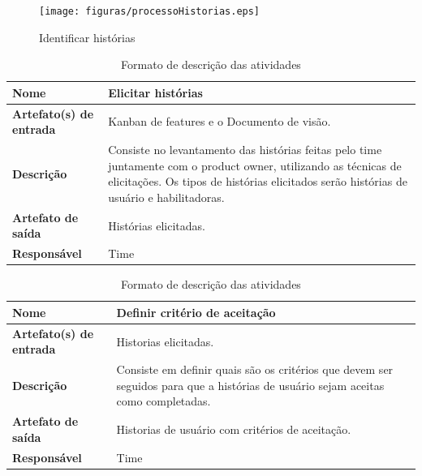 \begin{figure}[H]
    \centering
    \caption{Identificar histórias}
    \label{processoHistorias}
    \texttt{[image: figuras/processoHistorias.eps]}
\end{figure}

\begin{table}[h]
    \centering
    \label{descricaoAtividades}
    \caption{Formato de descrição das atividades}
        \begin{tabular}{|l|p{10cm}|}
        \hline
        \textbf{Nome} & Elicitar histórias \\
        \hline
        \textbf{Artefato(s) de entrada} & Kanban de features e o Documento de visão. \\
        \hline
        \textbf{Descrição} & Consiste no levantamento das histórias feitas pelo time juntamente com o product owner, utilizando as técnicas de elicitações. Os tipos de histórias elicitados serão histórias de usuário e habilitadoras. \\
        \hline
        \textbf{Artefato de saída} & Histórias elicitadas. \\
        \hline
        \textbf{Responsável} & Time \\
        \hline
    \end{tabular}
\end{table}

\begin{table}[h]
    \centering
    \label{descricaoAtividades}
    \caption{Formato de descrição das atividades}
        \begin{tabular}{|l|p{10cm}|}
        \hline
        \textbf{Nome} & Definir critério de aceitação \\
        \hline
        \textbf{Artefato(s) de entrada} & Historias elicitadas. \\
        \hline
        \textbf{Descrição} & Consiste em definir quais são os critérios que devem ser seguidos para que a histórias de usuário sejam aceitas como completadas. \\
        \hline
        \textbf{Artefato de saída} & Historias de usuário com critérios de aceitação. \\
        \hline
        \textbf{Responsável} & Time \\
        \hline
    \end{tabular}
\end{table}


